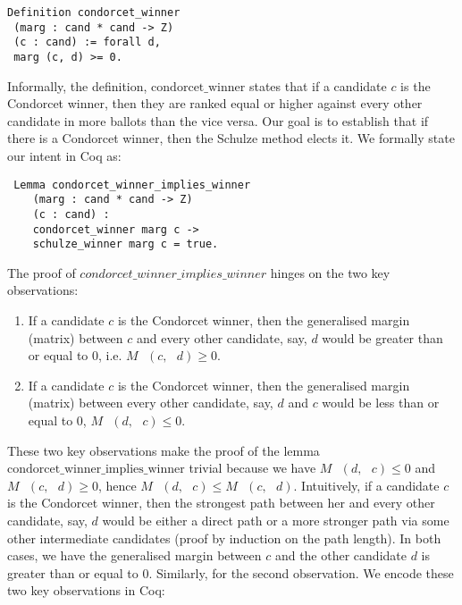 \documentclass[compsoc,conference,a4paper,10pt,times]{IEEEtran}
\begin{document}
\begin{verbatim}
Definition condorcet_winner 
 (marg : cand * cand -> Z) 
 (c : cand) := forall d, 
 marg (c, d) >= 0.
\end{verbatim}

  Informally, the definition, $\mathrm{condorcet\_winner}$ states that 
  if a candidate $c$  is the Condorcet winner, then they are
  ranked equal or higher against
  every other candidate in more ballots than the vice versa. 
  Our goal is to establish that if there is a 
  Condorcet winner, then the Schulze method
  elects it. We formally state our intent 
  in Coq as:
 	
\begin{verbatim}
 Lemma condorcet_winner_implies_winner 
    (marg : cand * cand -> Z)
    (c : cand) : 
    condorcet_winner marg c -> 
    schulze_winner marg c = true. 

\end{verbatim}

  		
 The proof of $condorcet\_winner\_implies\_winner$ hinges on the two key observations:
 
 \begin{enumerate}
  \item If a candidate $c$ is the Condorcet winner, then the generalised margin (matrix) 
  between $c$
  and every other candidate, say, $d$ would be greater than or equal to 0, i.e. 
  $M \text{ } (c, \text{ }d) \geq 0$.
  
  \item If a candidate $c$ is the Condorcet winner, then the generalised margin  (matrix)
  between every other candidate, say, $d$ and $c$ would be less than or equal to 0, 
  $M \text{ } (d, \text{ }c) \leq 0$.
 \end{enumerate}
 
 
 These two key observations make the proof of the lemma
 $\mathrm{condorcet\_winner\_implies\_winner}$  
 trivial because we have $M \text{ } (d, \text{ }c) \leq 0$  and
  $M \text{ } (c, \text{ }d) \geq 0$, hence $M \text{ } (d, \text{ }c)  \leq 
   M \text{ } (c, \text{ }d)$. Intuitively, 
 if a candidate $c$ is the Condorcet winner, then the strongest path between her and every other 
 candidate, say, $d$ would be either a direct path or a more stronger path 
 via some other intermediate candidates (proof by induction on the path length). 
 In both cases, we have the generalised margin between 
 $c$ and the other candidate $d$ is greater than or equal to 0. 
 Similarly, for the second observation. We encode these two key observations in 
 Coq:
 
\end{document}
